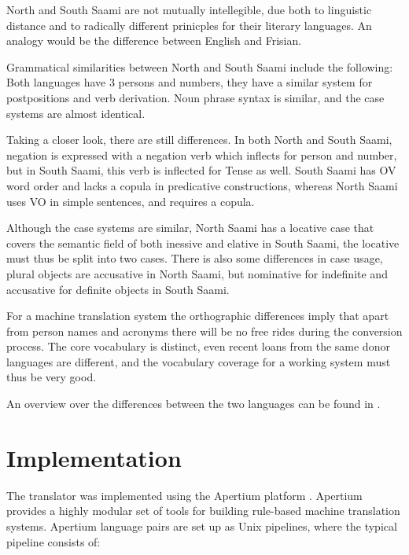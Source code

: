 \documentclass[a4paper,11pt,twocolumn]{article}
\begin{document}
North and South Saami are not mutually intellegible, due both to
linguistic distance and to radically different prinicples for their
literary languages. An analogy would be the difference between English 
and Frisian. 

Grammatical similarities between North and South Saami include the 
following: Both languages have 3 persons and numbers, they have a similar
system for postpositions and verb derivation. Noun phrase syntax is 
similar, and the case systems are almost identical.

Taking a closer look, there are still differences. In both North and
South Saami, negation is expressed with a negation verb which inflects
for person and number, but in 
South Saami, this verb is inflected for Tense as well. South Saami
has OV word order and lacks a copula in predicative constructions, 
whereas North Saami uses VO in simple sentences, and requires a copula.

Although the case systems are similar, North Saami has a locative case
that covers the semantic field of both inessive and elative in 
South Saami, the locative must thus be split into two cases. There is
also some differences in case usage, plural objects are accusative
in North Saami, but nominative for indefinite and accusative for 
definite objects in South Saami.

For a machine translation system the orthographic differences 
imply that apart from person
names and acronyms there will be no free rides during the conversion 
process. The core vocabulary is distinct, even recent loans from
the same donor languages are different, and the vocabulary coverage
for a working system must thus be very good.

An overview over the differences between the two languages can
be found in \cite{sammallahti98}.


\section{Implementation}

The translator was implemented using the Apertium platform \cite{forcada2011}. Apertium 
provides a highly modular set of tools for building rule-based
machine translation systems. Apertium language pairs are set up as Unix pipelines, where the
typical pipeline consists of:
\end{document}
